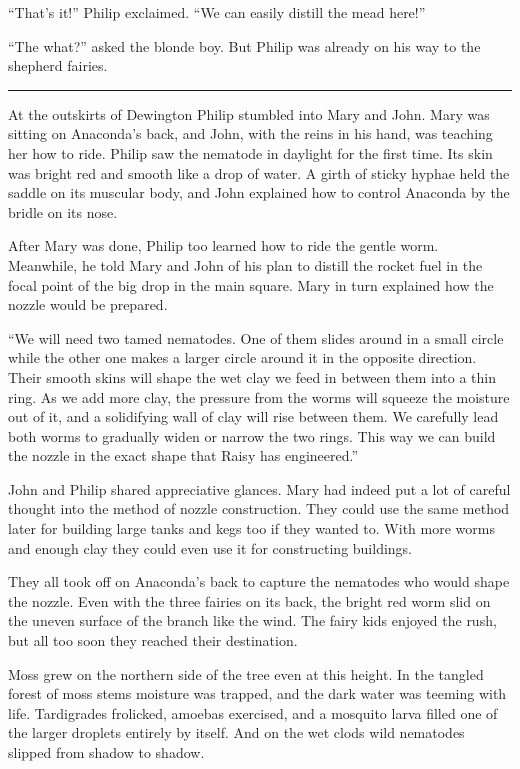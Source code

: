 \documentclass[10pt, draft]{memoir}
\renewcommand{\pfbreakdisplay}{\bigskip \ding{166} \bigskip}
\newcommand{\secbreak}{\fancybreak{\pfbreakdisplay}}
\begin{document}
``That's it!'' Philip exclaimed. ``We can easily distill the mead here!''

``The what?'' asked the blonde boy. But Philip was already on his way to the shepherd fairies.

\secbreak

At the outskirts of Dewington Philip stumbled into Mary and John. Mary was sitting on Anaconda's back, and John, with the reins in his hand, was teaching her how to ride. Philip saw the nematode in daylight for the first time. Its skin was bright red and smooth like a drop of water. A girth of sticky hyphae held the saddle on its muscular body, and John explained how to control Anaconda by the bridle on its nose.

After Mary was done, Philip too learned how to ride the gentle worm. Meanwhile, he told Mary and John of his plan to distill the rocket fuel in the focal point of the big drop in the main square. Mary in turn explained how the nozzle would be prepared.

``We will need two tamed nematodes. One of them slides around in a small circle while the other one makes a larger circle around it in the opposite direction. Their smooth skins will shape the wet clay we feed in between them into a thin ring. As we add more clay, the pressure from the worms will squeeze the moisture out of it, and a solidifying wall of clay will rise between them. We carefully lead both worms to gradually widen or narrow the two rings. This way we can build the nozzle in the exact shape that Raisy has engineered.''

John and Philip shared appreciative glances. Mary had indeed put a lot of careful thought into the method of nozzle construction. They could use the same method later for building large tanks and kegs too if they wanted to. With more worms and enough clay they could even use it for constructing buildings.

They all took off on Anaconda's back to capture the nematodes who would shape the nozzle. Even with the three fairies on its back, the bright red worm slid on the uneven surface of the branch like the wind. The fairy kids enjoyed the rush, but all too soon they reached their destination.

Moss grew on the northern side of the tree even at this height. In the tangled forest of moss stems moisture was trapped, and the dark water was teeming with life. Tardigrades frolicked, amoebas exercised, and a mosquito larva filled one of the larger droplets entirely by itself. And on the wet clods wild nematodes slipped from shadow to shadow.
\end{document}
